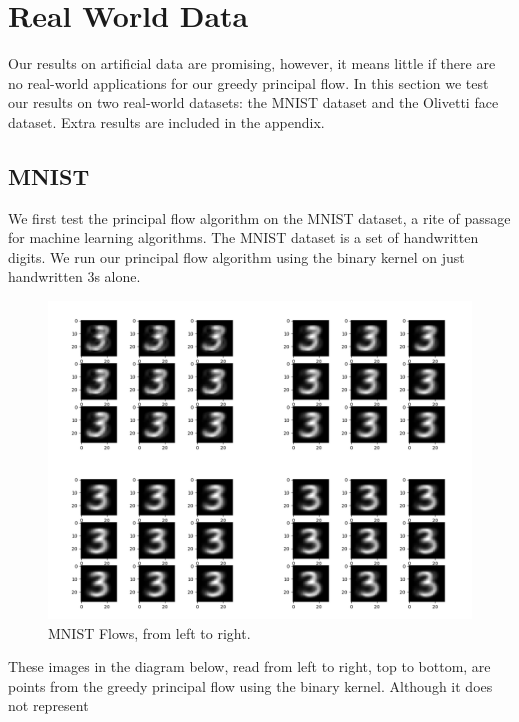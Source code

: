 \documentclass[12pt]{report}
\begin{document}
\newpage

\section{Real World Data}

Our results on artificial data are promising, however, it means little
if there are no real-world applications for our greedy principal flow. 
In this section we test our results on two real-world datasets: the MNIST dataset
and the Olivetti face dataset. Extra results are included in the appendix.

\subsection{MNIST}
 
We first test the principal flow algorithm on the MNIST dataset, a rite of passage
for machine learning algorithms. The MNIST dataset is a set of handwritten digits.
We run our principal flow algorithm using the binary kernel 
on just handwritten 3s alone.\\  
\begin{figure}[ht]
    \begin{center}
        \includegraphics[scale=0.35]{main_mnist.png}
        \caption{MNIST Flows, from left to right.}
        \label{fig:mnistflows}
    \end{center}
\end{figure}
These images in the diagram below, read from left to right, 
top to bottom, are points from the greedy principal 
flow using the binary kernel. Although it does not represent 
\end{document}
